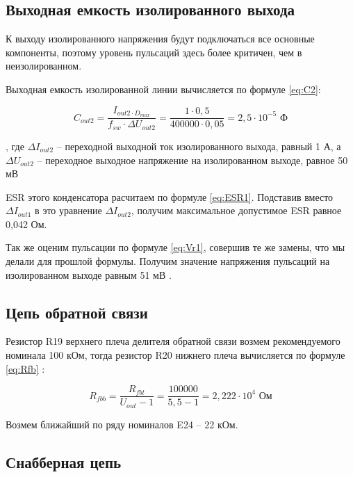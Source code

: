 \subsection{Выходная емкость изолированного выхода}
\hspace{1cm}

К выходу изолированного напряжения будут подключаться все основные компоненты, поэтому уровень пульсаций 
здесь более критичен, чем в неизолированном. 

Выходная емкость изолированной линии вычисляется по формуле \ref{eq:C2}:

\begin{equation}
    C_{out2} = \frac{I_{out2 \cdot D_{max}}}{f_{sw} \cdot \Delta U_{out2}} =
    \frac{1 \cdot 0,5}{400000 \cdot 0,05} =
    2,5 \cdot 10^{-5} \text{ Ф}
    \label{eq:C2}
\end{equation}

, где $\Delta I_{out2}$ -- переходной выходной ток изолированного выхода, равный 1 А, а $\Delta U_{out2}$ --
переходное выходное напряжение на изолированном выходе, равное 50 мВ

ESR этого конденсатора расчитаем по формуле \ref{eq:ESR1}.  Подставив вместо $\Delta I_{out1}$ 
в это уравнение $\Delta I_{out2}$, получим максимальное допустимое ESR равное 0,042 Ом.

Так же оценим пульсации по формуле \ref{eq:Vr1}, совершив те же замены, что мы делали для прошлой формулы. 
Получим значение напряжения пульсаций на изолированном выходе равным 51 мВ \cite{LMR36520:Aplication Note}. 


\subsection{Цепь обратной связи}
\hspace{1cm}

Резистор R19 верхнего плеча делителя обратной связи возмем рекомендуемого номинала 100 кОм, тогда резистор
R20 нижнего плеча вычисляется по формуле \ref{eq:Rfb} \cite{LMR36520:datasheet}:

\begin{equation}
   R_{fbb} = \frac{R_{fbt}}{U_{out} - 1} =
   \frac{100000}{5,5 - 1} = 2,222 \cdot 10^{4} \text{ Ом}
    \label{eq:Rfb}
\end{equation}

Возмем ближайший по ряду номиналов E24 -- 22 кОм. 


\subsection{Снабберная цепь}
\hspace{1cm}



